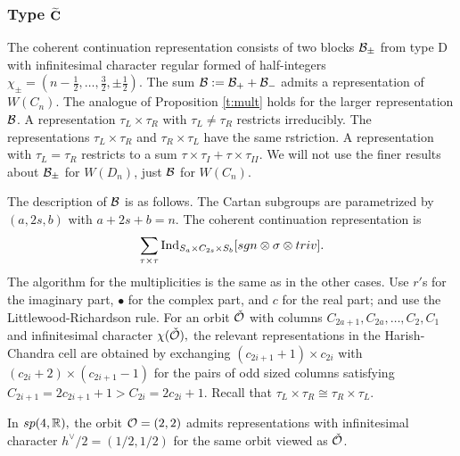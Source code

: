 \documentclass[11pt ,reqno]{amsart}
\begin{document}
\subsubsection{Type $\mathbf{{\widetilde C}}$}\label{ctilde}
{The coherent continuation representation  consists of
  two blocks ${\mathcal B}_\pm$  from type D with infinitesimal
  character  regular formed of half-integers  $\chi_\pm=(n-\frac12,\dots ,\frac32,\pm \frac12)$. 
The sum ${\mathcal B}:={\mathcal B}_++{\mathcal B}_-$ admits a representation of $W(C_n).$ The
analogue of Proposition \ref{t:mult} holds for the larger
representation ${\mathcal B}$. A representation $\tau_L\times \tau_R$ with
$\tau_L\ne \tau_R$ restricts irreducibly. The representations $\tau_L\times \tau_R$ and
$\tau_R\times\tau_L$ have the same rstriction. A representation with
$\tau_L=\tau_R$ restricts to a sum
$\tau\times\tau_I+\tau\times\tau_{II}.$ We will not use the finer
results about ${\mathcal B}_\pm$ for $W(D_n)$, just ${\mathcal B}$ for $W(C_n).$  

The description of ${\mathcal B}$ is as follows. The Cartan subgroups are
parametrized by $(a,2s,b)$ with $a+2s+b=n.$ The coherent continuation representation is
$$
\sum_{\tau\times\tau}\operatorname{Ind}_{S_a\times C_{2s}\times S_b}[sgn\otimes {\sigma}\otimes triv]. 
$$
The algorithm for the multiplicities is the same as in the other
cases. Use $r'$s for the imaginary part, $\bullet$ for the complex part,
and $c$ for the real part; and use the Littlewood-Richardson rule.
For an orbit ${\check {\mathcal O}}$ with columns $C_{2a+1},C_{2a},\dots , C_2,C_1$ and
infinitesimal character $\chi({\check {\mathcal O}}),$  the relevant representations in
the Harish-Chandra cell are obtained by exchanging $(c_{2i+1}+1)\times c_{2i}$
with $(c_{2i}+2)\times (c_{2i+1}-1)$ for the pairs of odd sized columns
satisfying $C_{2i+1}=2c_{2i+1}+1>C_{2i}=2c_{2i}+1.$ Recall that
$\tau_L\times\tau_R\cong \tau_R\times\tau_L.$ 
\begin{example*}[$Mp(4,\bb R)$]
  



In
$sp(4,{\mathbb R}),$ the orbit ${\mathcal O}=(2,2)$ admits representations with
infinitesimal character $h^\vee/2=(1/2,1/2)$ for the same
orbit viewed as ${\check {\mathcal O}}$. 


\end{example*}}
\end{document}
